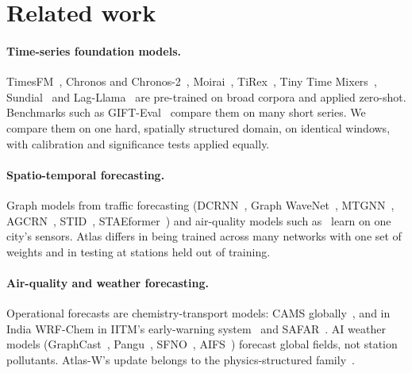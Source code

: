 \documentclass{article}
\begin{document}
\section{Related work}
\label{sec:related}

\paragraph{Time-series foundation models.} TimesFM~\citep{das2024timesfm,timesfm25}, Chronos and
Chronos-2~\citep{ansari2024chronos,ansari2025chronos2,chronosbolt}, Moirai~\citep{woo2024moirai,moirai2},
TiRex~\citep{auer2025tirex}, Tiny Time Mixers~\citep{ekambaram2024ttm}, Sundial~\citep{liu2025sundial} and
Lag-Llama~\citep{rasul2023lagllama} are pre-trained on broad corpora and applied zero-shot. Benchmarks such as
GIFT-Eval~\citep{aksu2024gifteval} compare them on many short series. We compare them on one hard, spatially
structured domain, on identical windows, with calibration and significance tests applied equally.

\paragraph{Spatio-temporal forecasting.} Graph models from traffic forecasting
(DCRNN~\citep{li2018dcrnn}, Graph WaveNet~\citep{wu2019graphwavenet}, MTGNN~\citep{wu2020mtgnn},
AGCRN~\citep{bai2020agcrn}, STID~\citep{shao2022stid}, STAEformer~\citep{liu2023staeformer}) and air-quality models
such as~\citep{zheng2015airquality,liang2018geoman} learn on one city's sensors. Atlas differs in being trained across
many networks with one set of weights and in testing at stations held out of training.

\paragraph{Air-quality and weather forecasting.} Operational forecasts are chemistry-transport models: CAMS
globally~\citep{inness2019cams}, and in India WRF-Chem in IITM's early-warning system~\citep{jena2021delhi400m,
sengupta2022delhi,yadav2025aqews} and SAFAR~\citep{beig2021safar}. AI weather models (GraphCast~\citep{lam2023graphcast},
Pangu~\citep{bi2023pangu}, SFNO~\citep{bonev2023sfno}, AIFS~\citep{lang2024aifs}) forecast global fields, not station
pollutants. Atlas-W's update belongs to the physics-structured family~\citep{karniadakis2021piml}.
\end{document}
